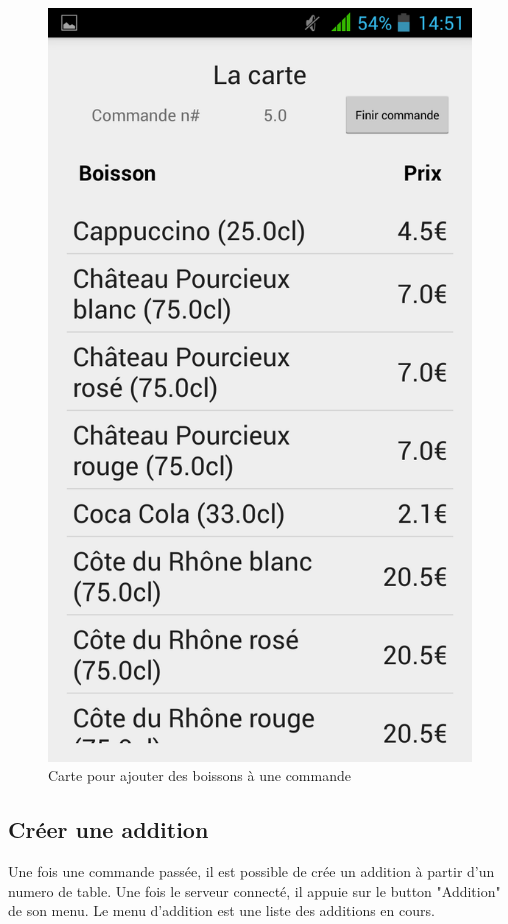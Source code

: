 \begin{figure}[H]
	\centering
	\includegraphics[scale=0.15]{img/new-order.png}
	\caption{Carte pour ajouter des boissons à une commande}
	\label{fig:drink-list}
\end{figure}

\subsection{Créer une addition}
Une fois une commande passée, il est possible de crée un addition à partir d'un numero de table. Une fois le serveur connecté, il appuie sur le button "Addition" de son menu. Le menu d'addition est une liste des additions en cours.

